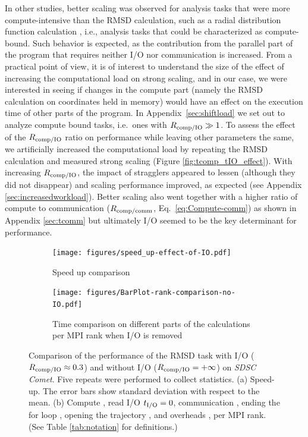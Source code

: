 In other studies, better scaling was observed for analysis tasks that were more compute-intensive than the RMSD calculation, such as a radial distribution function calculation \cite{Roe:2018aa, Fan:2019aa}, i.e., analysis tasks that could be characterized as compute-bound.
Such behavior is expected, as the contribution from the parallel part of the program that requires neither I/O nor communication is increased.
From a practical point of view, it is of interest to understand the size of the effect of increasing the computational load on strong scaling, and in our case, we were interested in seeing if changes in the compute part (namely the RMSD calculation on coordinates held in memory) would have an effect on the execution time of other parts of the program.
In Appendix~\ref{sec:shiftload} we set out to analyze compute bound tasks, i.e.\ ones with $R_{\text{comp/IO}} \gg 1$.
To assess the effect of the $R_{\text{comp/IO}}$ ratio on performance while leaving other parameters the same, we artificially increased the computational load by repeating the RMSD calculation and measured strong scaling (Figure \ref{fig:tcomp_tIO_effect}).
With increasing $R_{\text{comp/IO}}$, the impact of stragglers appeared to lessen (although they did not disappear) and scaling performance improved, as expected (see Appendix \ref{sec:increasedworkload}).
Better scaling also went together with a higher ratio of compute to communication ($R_{\text{comp/comm}}$, Eq.~\ref{eq:Compute-comm}) as shown in Appendix \ref{sec:tcomm} but ultimately I/O seemed to be the key determinant for performance.

 \begin{figure}[!htb]
   \centering
   \begin{subfigure}{.35\textwidth}
     \texttt{[image: figures/speed\_up-effect-of-IO.pdf]}
     \caption{Speed up comparison}
     \label{fig:MPIspeedup-no-IO}
   \end{subfigure}
   \hfill
   \begin{subfigure}{.45\textwidth}
     \texttt{[image: figures/BarPlot-rank-comparison-no-IO.pdf]}
     \captionsetup{format=hang}
     \caption{Time comparison on different parts of the calculations per MPI rank when I/O is removed}
     \label{fig:MPIranks-no-IO}
   \end{subfigure}
   \caption{Comparison of the performance of the RMSD task with I/O ($R_{\text{comp/IO}} \approx 0.3$) and without I/O ($R_{\text{comp/IO}} = +\infty$) on \emph{SDSC Comet}.
     Five repeats were performed to collect statistics.
     (a) Speed-up. The error bars show standard deviation with respect to the mean.
     (b) Compute \tcomp, read I/O ${t}_{\text{I/O}}=0$, communication \tcomm, ending the for loop ,
     opening the trajectory , and overheads ,  per MPI rank.
     (See Table \ref{tab:notation} for definitions.)}
   \label{fig:MPIwithoutIO}
\end{figure}

